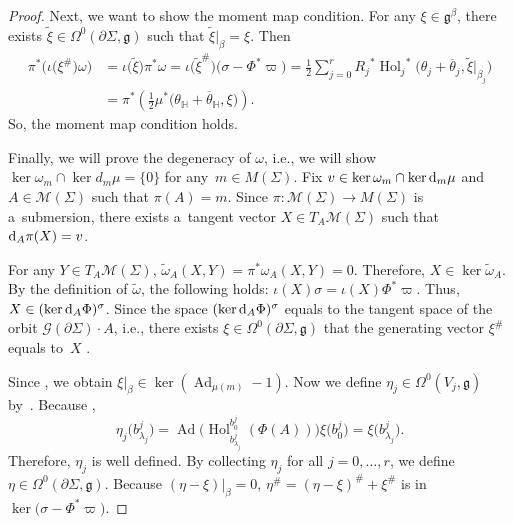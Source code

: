 \documentclass[10pt,a4paper]{amsart}
\numberwithin{equation}{section}
\theoremstyle{definition}
\newcommand{\Ad}{\operatorname{Ad}}
\newcommand{\Hol}{\operatorname{Hol}}
\newcommand{\bH}{\mathbb{H}}
\begin{document}
\begin{proof}
 Next, we want to show the moment map condition.
 For any $\xi \in \mathfrak{g}^{\beta}$, there exists $\tilde{\xi} \in \Omega^0(\partial \Sigma,\mathfrak{g})$ such that $\tilde{\xi}|_{\beta} = \xi$.
 Then
 \begin{align*}
 \pi^*\bigl(\iota\bigl(\xi^{\#}\bigr)\omega\bigr) &= \iota\bigl(\tilde{\xi}\bigr) \pi^*\omega
 = \iota\bigl(\tilde{\xi}^{\#}\bigr) \bigl(\sigma-\Phi^*\varpi\bigr)
 = \frac{1}{2} \sum_{j=0}^{r} {R_j}^*{\Hol_j}^*\bigl(\theta_j+ \overline{\theta}_j,\tilde{\xi}|_{\beta_{j}}\bigr)\\
 &= \pi^* \left( \frac{1}{2} \mu^* \bigl(\theta_{\bH} + \overline{\theta}_{\bH},\xi\bigr)\right).
 \end{align*}
 So, the moment map condition holds.

 Finally, we will prove the degeneracy of $\omega$, i.e., we will show $\ker \omega_m \cap \ker d_m \mu = \{0\}$ for any~$m \in M(\Sigma)$.
 Fix $v \in \ker \omega_m \cap \ker {\rm d}_m \mu$ and $A \in \mathcal{M}(\Sigma)$ such that $\pi(A)=m$.
 Since $\pi \colon \mathcal{M}(\Sigma) \to M(\Sigma)$ is a~submersion, there exists a~tangent vector $X \in T_A \mathcal{M}(\Sigma)$ such that ${\rm d}_A\pi(X)=v$.

 For any $Y \in T_A\mathcal{M}(\Sigma)$,
$\tilde{\omega}_A(X,Y) = \pi^*\omega _A(X,Y) = 0$.
 Therefore, $X \in \ker \tilde{\omega}_A$. By the definition of $\tilde{\omega}$, the following holds:
$\iota(X) \sigma= \iota(X) \Phi^*\varpi$.
Thus, $X \in (\ker {\rm d}_A \Phi )^{\sigma}$.
 Since the space $( \ker {\rm d}_A \Phi )^{\sigma}$ equals to the tangent space of the orbit $\mathcal{G}(\partial \Sigma) \cdot A$, i.e., there exists $\xi \in \Omega^0(\partial \Sigma, \mathfrak{g})$ that the generating vector $\xi^{\#}$ equals to~$X$ \cite[Theorem~9.1]{AMM}.

 Since , we obtain
 $\xi|_{\beta} \in \ker(\Ad_{\mu(m)}-1)$.
 Now we define $\eta_j \in \Omega^0(V_j,\mathfrak{g})$ by~\smash{$
 \eta_j(s) := \Ad\bigl(\Hol^{b^{j}_0}_{s}(\Phi(A))^{-1}\bigr)\xi\bigl(b^{j}_0\bigr)$}.
 Because \smash{$\Ad_{\mu(m)}\xi|_{\beta} = \xi|_{\beta}$},
 \[
 \eta_j\bigl(b^{j}_{\lambda_j}\bigr) = \Ad\bigl(\Hol^{b^{j}_0}_{b^{j}_{\lambda_j}}(\Phi(A))\bigr)\xi\bigl(b^{j}_0\bigr) = \xi\bigl(b^{j}_{\lambda_j}\bigr).
 \]
 Therefore, $\eta_j$ is well defined.
 By collecting $\eta_j$ for all $j =0,\dots,r$, we define $\eta \in \Omega^0(\partial \Sigma, \mathfrak{g})$.
 Because $(\eta-\xi)|_{\beta} = 0$, $\eta^{\#} = (\eta - \xi)^{\#} + \xi^{\#}$ is in $\ker\bigl(\sigma- \Phi^* \varpi\bigr)$.


\end{proof}
\end{document}
